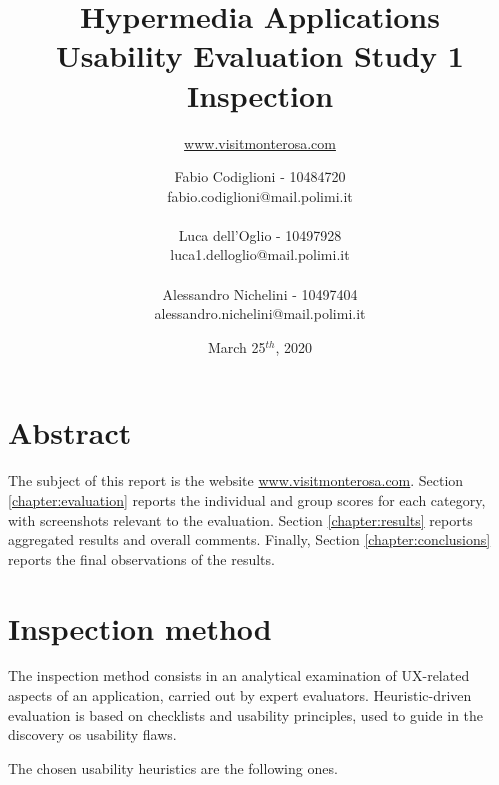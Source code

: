 \documentclass[a4paper, 11pt, parskip=half, headsepline]{scrreprt}
\title{Hypermedia Applications\\Usability Evaluation Study 1\\ Inspection }
\subtitle{\href{https://www.visitmonterosa.com}{www.visitmonterosa.com}}
\author{Fabio Codiglioni - 10484720\\fabio.codiglioni@mail.polimi.it\\\\Luca dell'Oglio - 10497928\\luca1.delloglio@mail.polimi.it\\\\Alessandro Nichelini - 10497404\\alessandro.nichelini@mail.polimi.it}
\date{March 25$^{th}$, 2020}
\begin{document}
\maketitle
\tableofcontents
\newpage
{}


\chapter{Abstract}

The subject of this report is the website \href{www.visitmonterosa.com}{www.visitmonterosa.com}. Section \ref{chapter:evaluation} reports the individual and group scores for each category, with screenshots relevant to the evaluation. Section \ref{chapter:results} reports aggregated results and overall comments. Finally, Section \ref{chapter:conclusions} reports the final observations of the results.




\chapter{Inspection method}
\label{chapter:method}

The inspection method consists in an analytical examination of UX-related aspects of an application, carried out by expert evaluators. Heuristic-driven evaluation is based on checklists and usability principles, used to guide in the discovery os usability flaws.

The chosen usability heuristics are the following ones.
\end{document}
